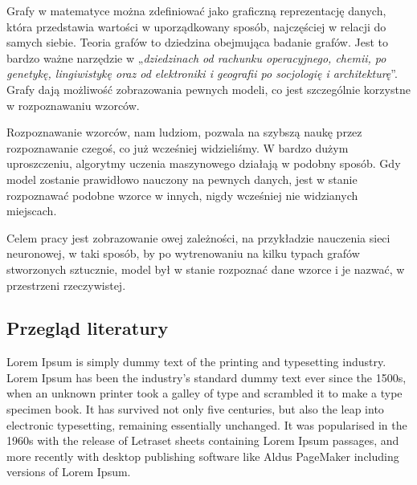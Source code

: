 Grafy w matematyce można zdefiniować jako graficzną reprezentację danych,
która przedstawia wartości w uporządkowany sposób,
najczęściej w relacji do samych siebie.
Teoria grafów to dziedzina obejmująca badanie grafów.
Jest to bardzo ważne narzędzie w „\textit{dziedzinach od rachunku operacyjnego, chemii, po genetykę, lingiwistykę
oraz od elektroniki i geografii po socjologię i architekturę}”\cite{Wilson2012}.
Grafy dają możliwość zobrazowania pewnych modeli, co jest szczególnie korzystne w rozpoznawaniu wzorców.

Rozpoznawanie wzorców, nam ludziom, pozwala na szybszą naukę przez rozpoznawanie czegoś, co już wcześniej widzieliśmy.
W bardzo dużym uproszczeniu, algorytmy uczenia maszynowego działają w podobny sposób.
Gdy model zostanie prawidłowo nauczony na pewnych danych, jest w stanie rozpoznawać podobne wzorce w innych,
nigdy wcześniej nie widzianych miejscach.

Celem pracy jest zobrazowanie owej zależności, na przykładzie nauczenia sieci neuronowej,
w taki sposób, by po wytrenowaniu na kilku typach grafów stworzonych sztucznie,
model był w stanie rozpoznać dane wzorce i je nazwać, w przestrzeni rzeczywistej.

\subsection{Przegląd literatury}
Lorem Ipsum is simply dummy text of the printing and typesetting industry. Lorem Ipsum has been the industry's standard dummy text ever since the 1500s, when an unknown printer took a galley of type and scrambled it to make a type specimen book. It has survived not only five centuries, but also the leap into electronic typesetting, remaining essentially unchanged. It was popularised in the 1960s with the release of Letraset sheets containing Lorem Ipsum passages, and more recently with desktop publishing software like Aldus PageMaker including versions of Lorem Ipsum.
